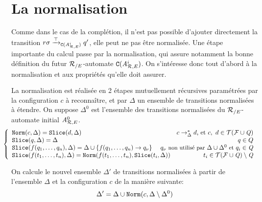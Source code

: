 \section{La normalisation}
Comme dans le cas de la complétion, il n'est pas possible d'ajouter directement
la transition $r\sigma \xrightarrow{\top}_{\mathtt{C}({\mathit A}_{\mathcal R,E}^{i})} q'$, elle peut ne pas être normalisée.
Une étape importante du calcul passe par la normalisation, qui assure notamment la bonne définition
du futur ${\mathcal R_{/E}}$-automate $\mathtt{C}({\mathit A}_{\mathcal R,E}^{i})$. 
On s'intéresse donc tout d'abord à la normalisation et aux propriétés qu'elle doit assurer.

\begin{definition}[Normalisation]
  \label{def:normalisation}
  La normalisation est réalisée en 2 étapes mutuellement récursives
  paramétrées par la configuration $c$ à reconnaître, et par $\Delta$ un ensemble de
  transitions normalisées à étendre. On suppose $\Delta^0$ est l'ensemble des transitions normalisées 
  du ${\mathcal R_{/E}}$-automate initial ${\mathit A}_{\mathcal R,E}^0$.
  \[\hspace{-.5cm}
  \left\{
    \begin{array}{lr}
      \norm(c, \Delta) = \slice(d, \Delta) & c \rw_\Delta^* d\textrm{, et }c,\ d \in \TFQ\\
      \slice(q,\Delta) = \Delta & q \in Q\\
      \slice(f(q_1,\dots, q_n), \Delta) = \Delta \cup \{f(q_1,\dots, q_n) \rw q_\nu\} &\hspace{-1.3cm}
      {\small q_\nu \textrm{ non utilisé par } \Delta \cup \Delta^0 \textrm{ et } q_i \in \Q}\\
      \slice(f(t_1,\dots, t_n), \Delta) = \norm(f(t_1,\dots, t_n), \slice(t_i, \Delta)) & t_i \in \TFQ \setminus \Q\\
    \end{array}
  \right.
  \]

  On calcule le nouvel ensemble $\Delta'$ de transitions normalisées à partir de l'ensemble $\Delta$ 
  et la configuration $c$ de la manière suivante:
  \[ \Delta' = \Delta \cup \mathtt{Norm}(c, \Delta \setminus \Delta^0)  \]

\end{definition}


